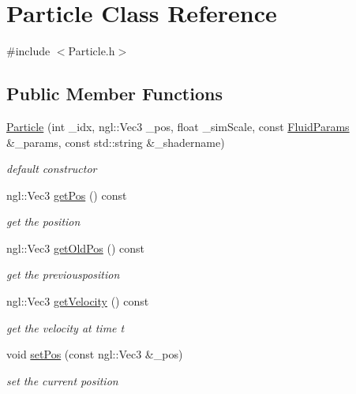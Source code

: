 \hypertarget{classParticle}{
\section{Particle Class Reference}
\label{classParticle}
}


{\ttfamily \#include $<$Particle.h$>$}\subsection*{Public Member Functions}
\begin{DoxyCompactItemize}
\item 
\hyperlink{classParticle_ac6f39cecbf6d1995e2167dacbc0ca5ae}{Particle} (int \_\-idx, ngl::Vec3 \_\-pos, float \_\-simScale, const \hyperlink{structFluidParams}{FluidParams} \&\_\-params, const std::string \&\_\-shadername)
\begin{DoxyCompactList}\small\item\em default constructor \item\end{DoxyCompactList}\item 
ngl::Vec3 \hyperlink{classParticle_a3c5efd4bc52c177c06439fc9eafe3438}{getPos} () const 
\begin{DoxyCompactList}\small\item\em get the position \item\end{DoxyCompactList}\item 
ngl::Vec3 \hyperlink{classParticle_a65eba0070673cb425a23a8a8496f6a17}{getOldPos} () const 
\begin{DoxyCompactList}\small\item\em get the previousposition \item\end{DoxyCompactList}\item 
ngl::Vec3 \hyperlink{classParticle_a3d46d63eefd8b6af8185907d545a973d}{getVelocity} () const 
\begin{DoxyCompactList}\small\item\em get the velocity at time t \item\end{DoxyCompactList}\item 
void \hyperlink{classParticle_ab78251d2269e22e833f9b7dfb45e832d}{setPos} (const ngl::Vec3 \&\_\-pos)
\begin{DoxyCompactList}\small\item\em set the current position \item\end{DoxyCompactList}\item 

\end{DoxyCompactItemize}
